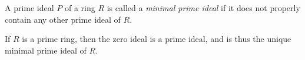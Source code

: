 \documentclass[12pt]{article}
\begin{document}
A prime ideal $P$ of a ring $R$ is called a {\it minimal prime ideal} if it does not properly contain any other prime ideal of $R$.

If $R$ is a prime ring, then the zero ideal is a prime ideal, and is thus the unique minimal prime ideal of $R$.
\end{document}
